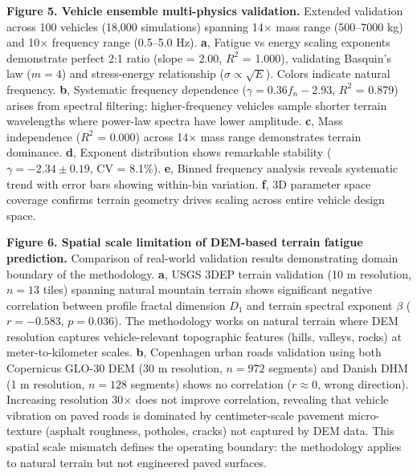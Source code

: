 \documentclass[11pt]{article}
\begin{document}
\textbf{Figure 5. Vehicle ensemble multi-physics validation.} 
Extended validation across 100 vehicles (18,000 simulations) spanning 14$\times$ mass range (500--7000 kg) and 10$\times$ frequency range (0.5--5.0 Hz). 
\textbf{a}, Fatigue vs energy scaling exponents demonstrate perfect 2:1 ratio (slope = 2.00, $R^2$ = 1.000), validating Basquin's law ($m = 4$) and stress-energy relationship ($\sigma \propto \sqrt{E}$). Colors indicate natural frequency. 
\textbf{b}, Systematic frequency dependence ($\gamma = 0.36 f_n - 2.93$, $R^2$ = 0.879) arises from spectral filtering: higher-frequency vehicles sample shorter terrain wavelengths where power-law spectra have lower amplitude. 
\textbf{c}, Mass independence ($R^2$ = 0.000) across 14$\times$ mass range demonstrates terrain dominance. 
\textbf{d}, Exponent distribution shows remarkable stability ($\gamma = -2.34 \pm 0.19$, CV = 8.1\%). 
\textbf{e}, Binned frequency analysis reveals systematic trend with error bars showing within-bin variation. 
\textbf{f}, 3D parameter space coverage confirms terrain geometry drives scaling across entire vehicle design space.

\textbf{Figure 6. Spatial scale limitation of DEM-based terrain fatigue prediction.} 
Comparison of real-world validation results demonstrating domain boundary of the methodology. 
\textbf{a}, USGS 3DEP terrain validation (10 m resolution, $n=13$ tiles) spanning natural mountain terrain shows significant negative correlation between profile fractal dimension $D_1$ and terrain spectral exponent $\beta$ ($r = -0.583$, $p = 0.036$). The methodology works on natural terrain where DEM resolution captures vehicle-relevant topographic features (hills, valleys, rocks) at meter-to-kilometer scales. 
\textbf{b}, Copenhagen urban roads validation using both Copernicus GLO-30 DEM (30 m resolution, $n=972$ segments) and Danish DHM (1 m resolution, $n=128$ segments) shows no correlation ($r \approx 0$, wrong direction). Increasing resolution 30$\times$ does not improve correlation, revealing that vehicle vibration on paved roads is dominated by centimeter-scale pavement micro-texture (asphalt roughness, potholes, cracks) not captured by DEM data. This spatial scale mismatch defines the operating boundary: the methodology applies to natural terrain but not engineered paved surfaces.
\end{document}
